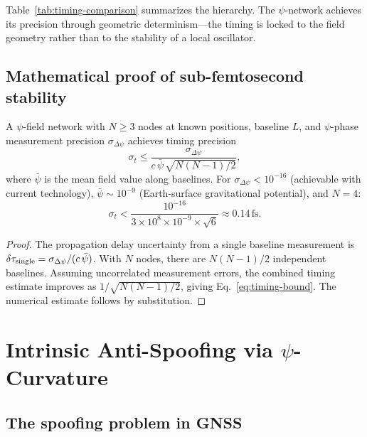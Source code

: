 \documentclass[aps,prd,twocolumn,superscriptaddress,nofootinbib]{revtex4-2}
\newcommand{\fs}{\,\mathrm{fs}}
\begin{document}
Table~\ref{tab:timing-comparison} summarizes the hierarchy. The
$\psi$-network achieves its precision through geometric
determinism---the timing is locked to the field geometry rather than to
the stability of a local oscillator.

\subsection{Mathematical proof of sub-femtosecond stability}\label{sec:proof-subfemto}

\begin{theorem}\label{thm:timing}
A $\psi$-field network with $N \geq 3$ nodes at known positions,
baseline $L$, and $\psi$-phase measurement precision
$\sigma_{\Delta\psi}$ achieves timing precision
\begin{equation}\label{eq:timing-bound}
\sigma_t \leq \frac{\sigma_{\Delta\psi}}{c\,\bar{\psi}\,\sqrt{N(N-1)/2}},
\end{equation}
where $\bar{\psi}$ is the mean field value along baselines. For
$\sigma_{\Delta\psi} < 10^{-16}$ (achievable with current
technology), $\bar{\psi} \sim 10^{-9}$ (Earth-surface gravitational
potential), and $N = 4$:
\begin{equation}
\sigma_t < \frac{10^{-16}}{3\times10^8 \times 10^{-9} \times \sqrt{6}}
\approx 0.14\fs.
\end{equation}
\end{theorem}

\begin{proof}
The propagation delay uncertainty from a single baseline measurement is
$\delta\tau_{\rm single} = \sigma_{\Delta\psi}/(c\,\bar{\psi})$.
With $N$ nodes, there are $N(N-1)/2$ independent baselines. Assuming
uncorrelated measurement errors, the combined timing estimate
improves as $1/\sqrt{N(N-1)/2}$, giving Eq.~\eqref{eq:timing-bound}.
The numerical estimate follows by substitution.
\end{proof}

\section{Intrinsic Anti-Spoofing via $\psi$-Curvature}\label{sec:antispoofing}

\subsection{The spoofing problem in GNSS}\label{sec:gnss-spoofing}
\end{document}
